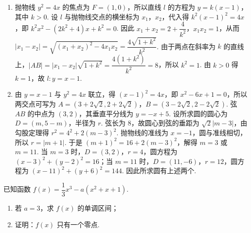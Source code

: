 \begin{solution}
\begin{enumerate}
\item 抛物线 \(y^2=4x\) 的焦点为 \(F=(1,0)\)，所以直线 \(l\) 的方程为 \(y=k(x-1)\)，其中 \(k>0\). 设 \(l\) 与抛物线交点的横坐标为 \(x_1\)，\(x_2\)，代入得 \(k^2(x-1)^2=4x\)，即 \(k^2x^2-(2k^2+4)x+k^2=0\). 因此 \(x_1+x_2=2+\dfrac4{k^2}\)，\(x_1x_2=1\)，从而
\(\lvert x_1-x_2\rvert=\sqrt{(x_1+x_2)^2-4x_1x_2}=\dfrac{4\sqrt{1+k^2}}{k^2}\). 由于两点在斜率为 \(k\) 的直线上，\(\lvert AB\rvert=\lvert x_1-x_2\rvert\sqrt{1+k^2}=\dfrac{4(1+k^2)}{k^2}=8\)，所以 \(k^2=1\). 由 \(k>0\) 得 \(k=1\)，故 \(l:y=x-1\).
\item 由 \(y=x-1\) 与 \(y^2=4x\) 联立，得 \((x-1)^2=4x\)，即 \(x^2-6x+1=0\)，所以两交点可写为 \(A=(3+2\sqrt2,2+2\sqrt2)\)，\(B=(3-2\sqrt2,2-2\sqrt2)\). 弦 \(AB\) 的中点为 \((3,2)\)，其垂直平分线为 \(y=-x+5\). 设所求圆的圆心为 \(D=(m,5-m)\)，半径为 \(r\). 弦长为 \(8\)，故圆心到弦的垂距为 \(\sqrt2\lvert m-3\rvert\)，由勾股定理得 \(r^2=4^2+2(m-3)^2\). 抛物线的准线为 \(x=-1\)，圆与准线相切，所以 \(r=\lvert m+1\rvert\). 于是
\((m+1)^2=16+2(m-3)^2\)，解得 \(m=3\) 或 \(m=11\). 当 \(m=3\) 时，\(D=(3,2)\)，\(r=4\)，圆方程为 \((x-3)^2+(y-2)^2=16\)；当 \(m=11\) 时，\(D=(11,-6)\)，\(r=12\)，圆方程为 \((x-11)^2+(y+6)^2=144\). 因此所求圆有上述两个.
\end{enumerate}
\end{solution}

\begin{problem}
已知函数 \(f(x)=\dfrac13x^3-a(x^2+x+1)\).

\begin{enumerate}
    \item 若 \(a=3\)，求 \(f(x)\) 的单调区间；
    \item 证明：\(f(x)\) 只有一个零点.
\end{enumerate}
\end{problem}

